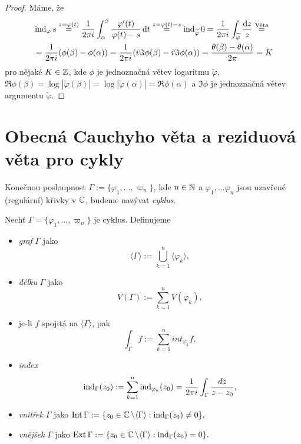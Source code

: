 \begin{proof}
Máme, že
\begin{equation*}
\begin{aligned}
&\operatorname{ind}_\varphi s\stackrel{z=\varphi(t)}{=}\frac{1}{2 \pi i}\int_\alpha^\beta \frac{\varphi'(t)}{\varphi(t)-s} \mathop{}\!\mathrm{d} t \stackrel{z=\varphi(t)-s}{=} \operatorname{ind}_{\widetilde{\varphi}}0=\frac{1}{2 \pi i} \int_{\widetilde{\varphi}} \frac{\mathop{}\!\mathrm{d} z}{z}\stackrel{\text{Věta}}{=}\\ &=  \frac{1}{2 \pi i}(\phi(\beta)-\phi(\alpha))=\frac{1}{2 \pi i}(i \Im \phi(\beta)-i \Im \phi(\alpha))=\frac{\theta(\beta)-\theta(\alpha)}{2 \pi}=K
\end{aligned}
\end{equation*}
pro nějaké $K \in \operatorname{\mathbb{Z}}$, kde $\phi$ je jednoznačná větev logaritmu $\widetilde{\varphi}$, $\Re \phi (\beta)=\log |\widetilde{\varphi}(\beta)|=\log |\widetilde{\varphi}(\alpha)|=\Re \phi (\alpha)$ a $\Im \phi$ je jednoznačná větev argumentu $\widetilde{\varphi}$.
\end{proof}

\section{Obecná Cauchyho věta a reziduová věta pro cykly}

\begin{definition}
Konečnou posloupnost $\Gamma:=\{\varphi_1, ... ,\varpi_n\}$, kde $n\in\operatorname{\mathbb{N}}$ a $\varphi_1, ... \varphi_n$ jsou uzavřené (regulární) křivky v $\operatorname{\mathbb{C}} $, budeme nazývat \emph{cyklus}.
\end{definition}

\begin{notation}
Nechť $\Gamma = \{\varphi_1, ... ,\varpi_n\}$ je cyklus. Definujeme
\begin{itemize}
    \item \emph{graf} $\Gamma$ jako $$\langle\Gamma\rangle:=\bigcup_{k=1}^n \langle\varphi_k\rangle,$$
    \item \emph{délku} $\Gamma$ jako $$V\left(\Gamma\right):=\sum_{k=1}^n V(\varphi_k),$$ 
    \item je-li $f$ spojitá na $\langle\Gamma\rangle$, pak $$\int_\Gamma f := \sum_{k=1}^n int_{\varphi_k}f,$$
    \item \emph{index} $$\operatorname{ind}_\Gamma(z_0):=\sum_{k=1}^n \operatorname{ind}_{\varphi_k}(z_0) = \frac{1}{2\pi i}\int_\Gamma \frac{dz}{z-z_0},$$
    \item \emph{vnitřek} $\Gamma$ jako $\operatorname{Int}\Gamma:=\{z_0\in\operatorname{\mathbb{C}} \setminus\langle\Gamma\rangle: \operatorname{ind}_\Gamma(z_0)\neq 0\},$
    \item \emph{vnějšek} $\Gamma$ jako $\operatorname{Ext} \Gamma:=\{z_0\in\operatorname{\mathbb{C}} \setminus\langle\Gamma\rangle: \operatorname{ind}_\Gamma(z_0)=0\}.$
\end{itemize}
\end{notation}

